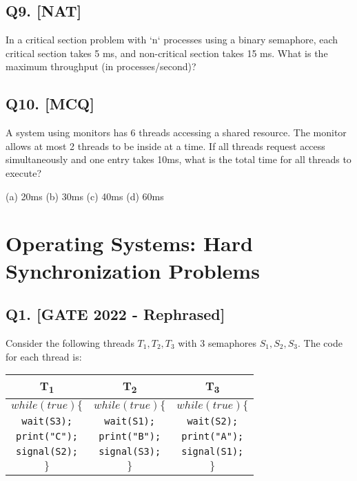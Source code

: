 \vspace{1em}

\subsection*{Q9. [NAT]}
In a critical section problem with `n` processes using a binary semaphore, each critical section takes 5 ms, and non-critical section takes 15 ms. What is the maximum throughput (in processes/second)?

\vspace{1em}

\subsection*{Q10. [MCQ]}
A system using monitors has 6 threads accessing a shared resource. The monitor allows at most 2 threads to be inside at a time. If all threads request access simultaneously and one entry takes 10ms, what is the total time for all threads to execute?

(a) 20ms \quad (b) 30ms \quad (c) 40ms \quad (d) 60ms

\section[Operating Systems: Hard Synchronization Problems]
{Operating Systems: Hard\\ Synchronization Problems}

\subsection*{Q1. [GATE 2022 - Rephrased]}
Consider the following threads \(T_1, T_2, T_3\) with 3 semaphores \(S_1, S_2, S_3\). The code for each thread is:
\begin{center}
\begin{tabular}{|c|c|c|}
\hline
\textbf{T\textsubscript{1}} & \textbf{T\textsubscript{2}} & \textbf{T\textsubscript{3}} \\
\hline
\texttt{$while(true)\{$} & \texttt{$while(true)\{$} & \texttt{$while(true)\{$} \\
\quad \texttt{wait(S3);} & \quad \texttt{wait(S1);} & \quad \texttt{wait(S2);} \\
\quad \texttt{print("C");} & \quad \texttt{print("B");} & \quad \texttt{print("A");} \\
\quad \texttt{signal(S2);} & \quad \texttt{signal(S3);} & \quad \texttt{signal(S1);} \\
\texttt{$\}$} & \texttt{$\}$} & \texttt{$\}$} \\
\hline
\end{tabular}
\end{center}

